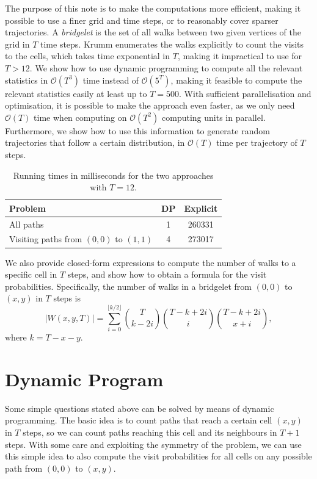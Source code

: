 \documentclass[11pt,a4paper,twoside,british]{article}
\begin{document}
The purpose of this note is to make the computations more efficient, making
it possible to use a finer grid and time steps, or to reasonably cover sparser
trajectories.
A \emph{bridgelet} is the set of all walks between two given vertices of the
grid in $T$ time steps.
Krumm enumerates the walks explicitly to count the visits to the cells, which
takes time exponential in $T$, making it impractical to use for $T > 12$.
We show how to use dynamic programming to compute all the relevant statistics
in $\mathcal{O}(T^3)$ time instead of $\mathcal{O}(5^T)$, making it feasible
to compute the relevant statistics easily at least up to $T = 500$.
With sufficient parallelisation and optimisation, it is possible to make the
approach even faster, as we only need $\mathcal{O}(T)$ time when computing on
$\mathcal{O}(T^2)$ computing units in parallel.
Furthermore, we show how to use this information to generate random trajectories
that follow a certain distribution, in $\mathcal{O}(T)$ time per trajectory of
$T$ steps.

\begin{table}
\centering
\begin{tabular}{l c c}
\toprule
Problem & DP & Explicit\\
\midrule
All paths & 1 & 260331\\
Visiting paths from $(0, 0)$ to $(1, 1)$ & 4 & 273017\\
\bottomrule
\end{tabular}
\caption{Running times in milliseconds for the two approaches with $T = 12$.}
\label{tab:running}
\end{table}

We also provide closed-form expressions to compute the number of walks to a
specific cell in $T$ steps, and show how to obtain a formula for the visit
probabilities.
Specifically, the number of walks in a bridgelet from $(0, 0)$ to $(x, y)$ in
$T$ steps is
\[\lvert W(x, y, T)\rvert = \sum_{i = 0}^{\lfloor k / 2\rfloor}
\binom{T}{k - 2i}\binom{T - k + 2i}{i}\binom{T - k + 2i}{x + i},\]
where $k = T - x - y$.

\section{Dynamic Program}
Some simple questions stated above can be solved by means of dynamic
programming.
The basic idea is to count paths that reach a certain cell $(x, y)$ in $T$
steps, so we can count paths reaching this cell and its neighbours in $T + 1$
steps.
With some care and exploiting the symmetry of the problem, we can use this
simple idea to also compute the visit probabilities for all cells on any
possible path from $(0, 0)$ to $(x, y)$.
\end{document}
